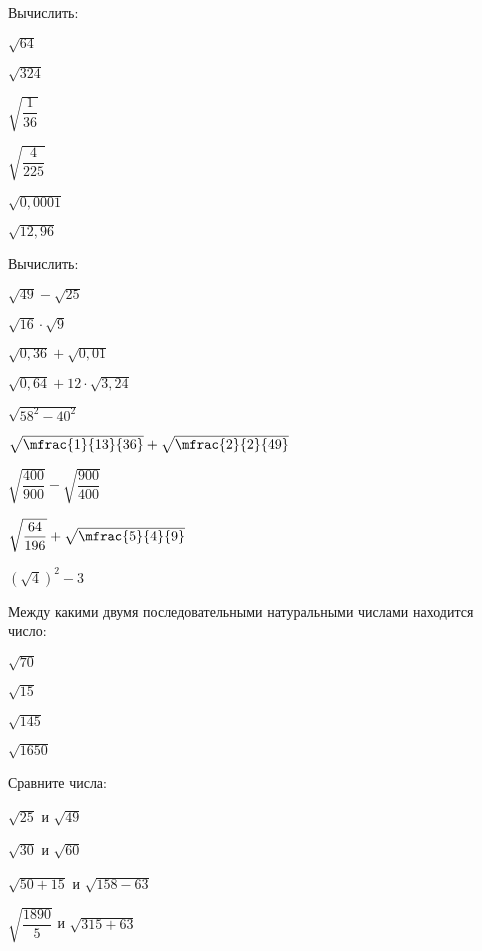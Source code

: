 %
%
\begin{homework}[number=1]
	\begin{listofex}
		\item Вычислить:
		\begin{enumcols}[itemcolumns=2]
			\item \( \sqrt{64} \)
			\item \( \sqrt{324} \)
			\item \( \sqrt{\dfrac{1}{36}} \)
			\item \( \sqrt{\dfrac{4}{225}} \)
			\item \( \sqrt{0,0001} \)
			\item \( \sqrt{12,96} \)
		\end{enumcols}
		\item Вычислить:
		\begin{enumcols}[itemcolumns=2]
			\item \( \sqrt{49}-\sqrt{25} \)
			\item \( \sqrt{16}\cdot\sqrt{9} \)
			\item \( \sqrt{0,36}+\sqrt{0,01} \)
			\item \( \sqrt{0,64}+12\cdot\sqrt{3,24} \)
			\item \( \sqrt{58^2-40^2} \)
			\item \( \sqrt{\mfrac{1}{13}{36}}+\sqrt{\mfrac{2}{2}{49}} \)
			\item \( \sqrt{\dfrac{400}{900}}-\sqrt{\dfrac{900}{400}} \)
			\item \( \sqrt{\dfrac{64}{196}}+\sqrt{\mfrac{5}{4}{9}} \)
			\item \( (\sqrt{4})^2-3 \)
		\end{enumcols}
		\item Между какими двумя последовательными натуральными числами находится число:
		\begin{enumcols}[itemcolumns=4]
			\item \( \sqrt{70} \)
			\item \( \sqrt{15} \)
			\item \( \sqrt{145} \)
			\item \( \sqrt{1650} \)
		\end{enumcols}
		\item Сравните числа:
		\begin{enumcols}[itemcolumns=2]
			\item \( \sqrt{25} \) и \( \sqrt{49} \)
			\item \( \sqrt{30} \) и \( \sqrt{60} \)
			\item \( \sqrt{50+15} \) и \( \sqrt{158-63} \)
			\item \( \sqrt{\dfrac{1890}{5}} \) и \( \sqrt{315+63} \)
		\end{enumcols}	
	\end{listofex}
\end{homework}
